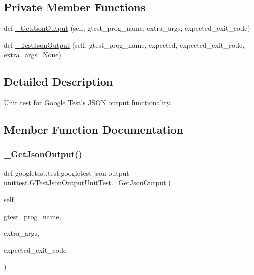 \subsection*{Private Member Functions}
\begin{DoxyCompactItemize}
\item 
def \mbox{\hyperlink{classgoogletest_1_1test_1_1googletest-json-output-unittest_1_1_g_test_json_output_unit_test_a280a0173df2cc7c61aa117067d53f571}{\+\_\+\+Get\+Json\+Output}} (self, gtest\+\_\+prog\+\_\+name, extra\+\_\+args, expected\+\_\+exit\+\_\+code)
\item 
def \mbox{\hyperlink{classgoogletest_1_1test_1_1googletest-json-output-unittest_1_1_g_test_json_output_unit_test_aad176abc66069eb18acf11dd9fa9c3b8}{\+\_\+\+Test\+Json\+Output}} (self, gtest\+\_\+prog\+\_\+name, expected, expected\+\_\+exit\+\_\+code, extra\+\_\+args=None)
\end{DoxyCompactItemize}


\subsection{Detailed Description}
\begin{DoxyVerb}Unit test for Google Test's JSON output functionality.
\end{DoxyVerb}
 

\subsection{Member Function Documentation}
\mbox{\label{classgoogletest_1_1test_1_1googletest-json-output-unittest_1_1_g_test_json_output_unit_test_a280a0173df2cc7c61aa117067d53f571}} 
\subsubsection{\texorpdfstring{\_GetJsonOutput()}{\_GetJsonOutput()}}
{\footnotesize\ttfamily def googletest.\+test.\+googletest-\/json-\/output-\/unittest.\+G\+Test\+Json\+Output\+Unit\+Test.\+\_\+\+Get\+Json\+Output (\begin{DoxyParamCaption}\item[{}]{self,  }\item[{}]{gtest\+\_\+prog\+\_\+name,  }\item[{}]{extra\+\_\+args,  }\item[{}]{expected\+\_\+exit\+\_\+code }\end{DoxyParamCaption})\hspace{0.3cm}{\ttfamily [private]}}

